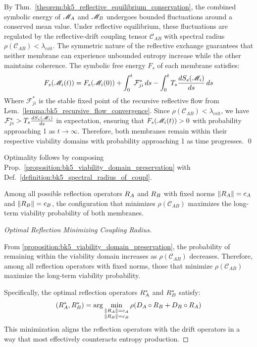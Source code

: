 \begin{demonstratio}
\label{demonstratio:bk5_energy_fluctuation_bound}
By Thm.~\ref{theorem:bk5_reflective_equilibrium_conservation}, the combined symbolic energy of $\mathscr{M}_A$ and $\mathscr{M}_B$ undergoes bounded fluctuations around a conserved mean value. Under reflective equilibrium, these fluctuations are regulated by the reflective-drift coupling tensor $\mathcal{C}_{AB}$ with spectral radius $\rho(\mathcal{C}_{AB}) < \lambda_{\text{crit}}$.
The symmetric nature of the reflective exchange guarantees that neither membrane can experience unbounded entropy increase while the other maintains coherence. The symbolic free energy $F_s$ of each membrane satisfies:
\begin{equation}
F_s(\mathscr{M}_i(t)) = F_s(\mathscr{M}_i(0)) + \int_0^t \mathcal{F}_{ji}^*\,ds - \int_0^t T_s\frac{dS_s(\mathscr{M}_i)}{ds}\,ds
\end{equation}
Where $\mathcal{F}_{ji}^*$ is the stable fixed point of the recursive reflective flow from Lem.~\ref{lemma:bk5_recursive_flow_convergence}.
Since $\rho(\mathcal{C}_{AB}) < \lambda_{\text{crit}}$, we have $\mathcal{F}_{ji}^* > T_s\frac{dS_s(\mathscr{M}_i)}{ds}$ in expectation, ensuring that $F_s(\mathscr{M}_i(t)) > 0$ with probability approaching 1 as $t \to \infty$.
Therefore, both membranes remain within their respective viability domains with probability approaching 1 as time progresses. \qed
\end{demonstratio}
\begin{corollary} \label{corollary:bk5_spectral_radius_optimality}
Optimality follows by composing Prop.~\ref{proposition:bk5_viability_domain_preservation} with Def.~\ref{definition:bk5_spectral_radius_of_coupl}.

Among all possible reflection operators $R_A$ and $R_B$ with fixed norms $\|R_A\| = c_A$ and $\|R_B\| = c_B$, the configuration that minimizes $\rho(\mathcal{C}_{AB})$ maximizes the long-term viability probability of both membranes.
\end{corollary}
\begin{proof}[Optimal Reflection Minimizing Coupling Radius]
\label{proof:bk5_optimal_reflection_minimizing_coupling_radius}
\leavevmode

From \autoref{proposition:bk5_viability_domain_preservation}, the probability of remaining within the viability domain increases as $\rho(\mathcal{C}_{AB})$ decreases. Therefore, among all reflection operators with fixed norms, those that minimize $\rho(\mathcal{C}_{AB})$ maximize the long-term viability probability.

Specifically, the optimal reflection operators $R_A^*$ and $R_B^*$ satisfy:
\begin{equation}
(R_A^*, R_B^*) =
\arg\min_{\substack{\|R_A\| = c_A \\ \|R_B\| = c_B}}
\rho(D_A \circ R_B + D_B \circ R_A)
\end{equation}
This minimization aligns the reflection operators with the drift operators in a way that most effectively counteracts entropy production.
\end{proof}

